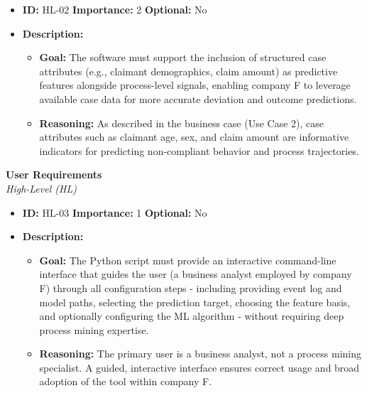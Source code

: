 \documentclass[12pt,a4paper]{article}
\begin{document}
\begin{itemize}
    \item \textbf{ID:} HL-02
 \textbf{Importance:} 2
 \textbf{Optional:} No
    \item \textbf{Description:}
    \begin{itemize}
        \item \textbf{Goal:} The software must support the inclusion of structured case attributes (e.g., claimant demographics, claim amount) as predictive features alongside process-level signals, enabling company F to leverage available case data for more accurate deviation and outcome predictions.
        \item \textbf{Reasoning:} As described in the business case (Use Case 2), case attributes such as claimant age, sex, and claim amount are informative indicators for predicting non-compliant behavior and process trajectories.
    \end{itemize}
\end{itemize}
\vspace{1.5em}

\noindent \textbf{User Requirements}\\
\noindent \textit{High-Level (HL)}

\begin{itemize}
    \item \textbf{ID:} HL-03
 \textbf{Importance:} 1
 \textbf{Optional:} No
    \item \textbf{Description:}
    \begin{itemize}
        \item \textbf{Goal:} The Python script must provide an interactive command-line interface that guides the user (a business analyst employed by company F) through all configuration steps - including providing event log and model paths, selecting the prediction target, choosing the feature basis, and optionally configuring the ML algorithm - without requiring deep process mining expertise.
        \item \textbf{Reasoning:} The primary user is a business analyst, not a process mining specialist. A guided, interactive interface ensures correct usage and broad adoption of the tool within company F.
    \end{itemize}
\end{itemize}
\vspace{1.5em}
\end{document}
